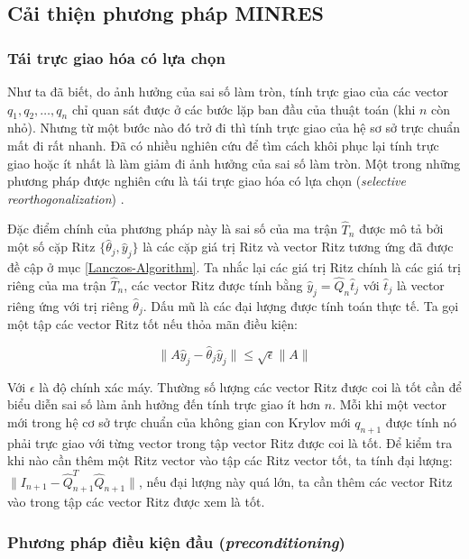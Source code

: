\documentclass[14pt, a4paper]{article}
\numberwithin{equation}{section}
\numberwithin{algorithm}{section}
\numberwithin{figure}{section}
\numberwithin{dl}{section}
\numberwithin{md}{section}
\numberwithin{bd}{section}
\numberwithin{dn}{section}
\numberwithin{hq}{section}
\begin{document}
\subsection{Cải thiện phương pháp MINRES}

\subsubsection{Tái trực giao hóa có lựa chọn}

Như ta đã biết, do ảnh hưởng của sai số làm tròn, tính trực giao của các vector $q_1, q_2, \dots, q_n$ chỉ quan sát được ở các bước lặp ban đầu của thuật toán (khi $n$ còn nhỏ). Nhưng từ một bước nào đó trở đi thì tính trực giao của hệ sơ sở trực chuẩn mất đi rất nhanh.
Đã có nhiều nghiên cứu để tìm cách khôi phục lại tính trực giao hoặc ít nhất là làm giảm đi ảnh hưởng của sai số làm tròn.
Một trong những phương pháp được nghiên cứu là tái trực giao hóa có lựa chọn (\textit{selective reorthogonalization}) \cite{parlett1979lanczos}.

Đặc điểm chính của phương pháp này là sai số của ma trận $\hat{T}_n$ được mô tả bởi một số cặp Ritz $\lbrace \hat{\theta}_j, \hat{y}_j \rbrace$ là các cặp giá trị Ritz và vector Ritz tương ứng đã được đề cập ở mục \ref{Lanczos-Algorithm}. Ta nhắc lại các giá trị Ritz chính là các giá trị riêng của ma trận $\hat{T}_n$, các vector Ritz được tính bằng $\hat{y}_j =\hat{Q}_n \hat{t}_j$ với $\hat{t}_j$ là vector riêng ứng với trị riêng $\hat{\theta}_j$. Dấu mũ là các đại lượng được tính toán thực tế.
Ta gọi một tập các vector Ritz tốt nếu thỏa mãn điều kiện:

\begin{equation}
    \lVert A \hat{y}_j - \hat{\theta}_j \hat{y}_j \rVert \leq \sqrt{\epsilon} \lVert A \rVert
\end{equation}

Với $\epsilon$ là độ chính xác máy.
Thường số lượng các vector Ritz được coi là tốt cần để biểu diễn sai số làm ảnh hưởng đến tính trực giao ít hơn $n$. Mỗi khi một vector mới trong hệ cơ sở trực chuẩn của không gian con Krylov mới $q_{n+1}$ được tính nó phải trực giao với từng vector trong tập vector Ritz được coi là tốt. Để kiểm tra khi nào cần thêm một Ritz vector vào tập các Ritz vector tốt, ta tính đại lượng:
$\lVert I_{n+1} - \hat{Q}_{n+1}^T \hat{Q}_{n+1} \rVert$, nếu đại lượng này quá lớn, ta cần thêm các vector Ritz vào trong tập các vector Ritz được xem là tốt.

\subsubsection{Phương pháp điều kiện đầu (\textit{preconditioning})}
\end{document}
